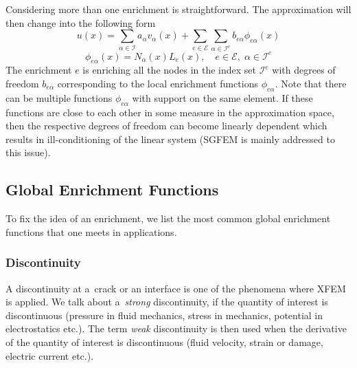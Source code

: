 Considering more than one enrichment is straightforward. The approximation will then change into the following form
\begin{equation} \label{eqn:soa_xfem_standard_form_mult1}
    u(x) = \sum_{\alpha\in\mathcal{I}}a_\alpha v_\alpha(x)
        + \sum_{e\in\mathcal{E}}\sum_{\alpha\in\mathcal{I}^e} b_{e\alpha} \phi_{e\alpha}(x)
\end{equation}
\begin{equation} \label{eqn:soa_xfem_standard_form_mult2}
    \phi_{e\alpha}(x) = N_\alpha(x)L_e(x), \quad e\in\mathcal{E},\; \alpha\in\mathcal{I}^e
\end{equation}
The enrichment $e$ is enriching all the nodes in the index set $\mathcal I^e$ with degrees of freedom $b_{e\alpha}$
corresponding to the local enrichment functions $\phi_{e\alpha}$. Note that there can be multiple functions $\phi_{e\alpha}$ with support on the same element. If these functions are close to each other in some measure in the approximation space, then the respective degrees of freedom can become linearly dependent which results in ill-conditioning of the linear system (SGFEM is mainly addressed to this issue).

\subsection{Global Enrichment Functions}
\label{sec:global_enrichment}
To fix the idea of an enrichment, we list the most common global enrichment functions that one meets in applications.

\subsubsection{Discontinuity}

A discontinuity at a~crack or an interface is one of the phenomena where XFEM is applied.
We talk about a~\emph{strong} discontinuity, if the quantity of interest is discontinuous (pressure in fluid mechanics, stress in mechanics, potential in electrostatics etc.).
The term \emph{weak} discontinuity is then used when the derivative of the quantity of interest is discontinuous (fluid velocity, strain or damage, electric current etc.).

